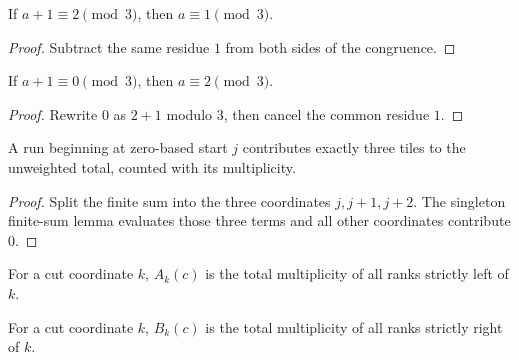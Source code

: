 \begin{lemma}

  \label{lem:modEq_of_add_one_modEq_two}
  If \(a+1\equiv2\pmod3\), then \(a\equiv1\pmod3\).
\end{lemma}
\begin{proof}

\leanok
  Subtract the same residue \(1\) from both sides of the congruence.
\end{proof}

\begin{lemma}

  \label{lem:modEq_of_add_one_modEq_zero}
  If \(a+1\equiv0\pmod3\), then \(a\equiv2\pmod3\).
\end{lemma}
\begin{proof}

\leanok
  Rewrite \(0\) as \(2+1\) modulo \(3\), then cancel the common residue
  \(1\).
\end{proof}

\begin{lemma}

  \label{lem:red_run_count_sum}
  A run beginning at zero-based start \(j\) contributes exactly three
  tiles to the unweighted total, counted with its multiplicity.
\end{lemma}
\begin{proof}

\leanok
  Split the finite sum into the three coordinates \(j,j+1,j+2\).  The
  singleton finite-sum lemma evaluates those three terms and all other
  coordinates contribute \(0\).
\end{proof}

\begin{definition}

  \label{def:left_total}
  For a cut coordinate \(k\), \(A_k(c)\) is the total multiplicity of
  all ranks strictly left of \(k\).
\end{definition}

\begin{definition}

  \label{def:right_total}
  For a cut coordinate \(k\), \(B_k(c)\) is the total multiplicity of
  all ranks strictly right of \(k\).
\end{definition}

